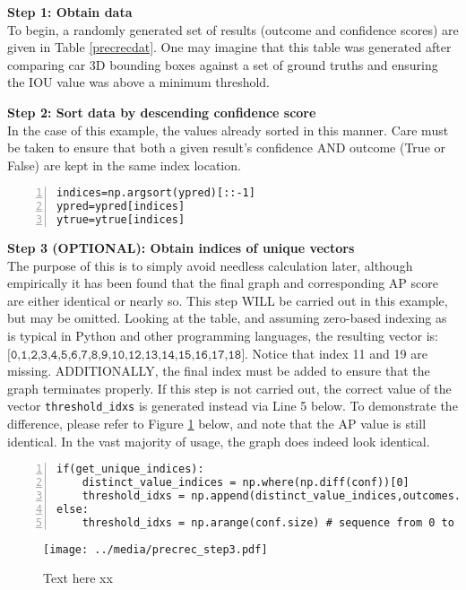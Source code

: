 \textbf{{\large Step 1: Obtain data}} \\
To begin, a randomly generated set of results (outcome and confidence scores) are given in Table \ref{precrecdat}. One may imagine that this table was generated after comparing car 3D bounding boxes against a set of ground truths and ensuring the IOU value was above a minimum threshold.

\textbf{{\large Step 2: Sort data by descending confidence score}} \\
In the case of this example, the values already sorted in this manner. Care must be taken to ensure that both a given result's confidence AND outcome (True or False) are kept in the same index location.
\begin{lstlisting}[numbers=left]
indices=np.argsort(ypred)[::-1]
ypred=ypred[indices]
ytrue=ytrue[indices]
\end{lstlisting}

\textbf{{\large Step 3 (OPTIONAL): Obtain indices of unique vectors}} \\
The purpose of this is to simply avoid needless calculation later, although empirically it has been found that the final graph and corresponding AP score are either identical or nearly so. This step WILL be carried out in this example, but may be omitted. Looking at the table, and assuming zero-based indexing as is typical in Python and other programming languages, the resulting vector is: $\texttt{[0,1,2,3,4,5,6,7,8,9,10,12,13,14,15,16,17,18]}$. Notice that index 11 and 19 are missing. ADDITIONALLY, the final index must be added to ensure that the graph terminates properly. If this step is not carried out, the correct value of the vector \texttt{threshold\_idxs} is generated instead via Line 5 below. To demonstrate the difference, please refer to Figure \ref{precrec_step3} below, and note that the AP value is still identical. In the vast majority of usage, the graph does indeed look identical.
\begin{lstlisting}[numbers=left]
if(get_unique_indices):
    distinct_value_indices = np.where(np.diff(conf))[0]
    threshold_idxs = np.append(distinct_value_indices,outcomes.size-1)
else:
    threshold_idxs = np.arange(conf.size) # sequence from 0 to N-1
\end{lstlisting}

\begin{figure}[ht]
    \centering
    \texttt{[image: ../media/precrec\_step3.pdf]}
    \caption{Text here xx}
    \label{precrec_step3}
\end{figure}



